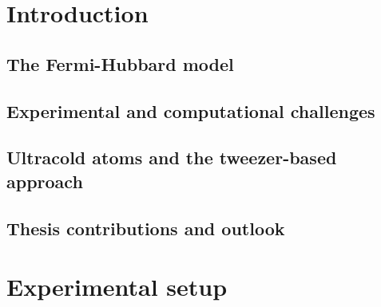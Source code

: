 \documentclass[twoside]{article}
\begin{document}



 

 \newpage
 \newpage
 \newpage
 \newpage



\section{Introduction} \label{sec:intro}
\subsection{The Fermi-Hubbard model}


\subsection{Experimental and computational challenges}


\subsection{Ultracold atoms and the tweezer-based approach}


\subsection{Thesis contributions and outlook}


% 

\newpage
\section{Experimental setup} \label{sec:exp-setup}



\end{document}
